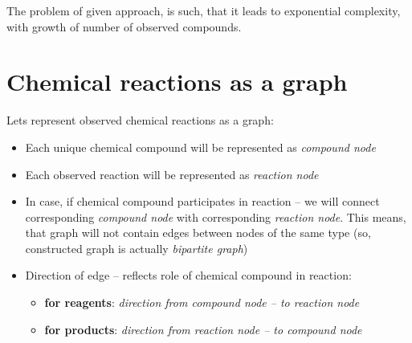 \documentclass[10pt]{article}
\begin{document}
The problem of given approach, is such, that it leads to exponential complexity, with growth of number of observed compounds.

\newpage

\section{Chemical reactions as a graph}

Lets represent observed chemical reactions as a graph: 
\begin{itemize}
    \item Each unique chemical compound will be represented as \emph{compound node}
    \item Each observed reaction will be represented as \emph{reaction node}
    \item In case, if chemical compound participates in reaction -- we will connect corresponding \emph{compound node} with corresponding \emph{reaction node}. This means, that graph will not contain edges between nodes of the same type (so, constructed graph is actually \emph{bipartite graph})
    \item Direction of edge -- reflects role of chemical compound in reaction:
        \begin{itemize} 
            \setlength \itemsep{0em}
            \item \textbf{for reagents}: \emph{direction from compound node -- to reaction node}
            \item \textbf{for products}: \emph{direction from reaction node -- to compound node}
        \end{itemize}
\end{itemize}
\end{document}
